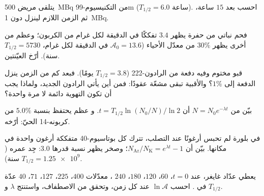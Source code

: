 \begin{exercise}[$\star\star$]\label{exo:g12:radioactive-decay:9}
يتلقى مريض \qty{500}{MBq} من التكنيسيوم-99m ($T_{1/2} = 6.0$
ساعة). احسب  بعد $15$ ساعة، ثم الزمن اللازم لينزل
دون \qty{1}{MBq}.
\end{exercise}

\begin{exercise}[$\star\star$]\label{exo:g12:radioactive-decay:10}
فحم نباتي من حفرة يظهر $3.4$ تفككًا في الدقيقة لكل غرام من الكربون؛
وعظم من أخرى يظهر $30\%$ من معدّل الأحياء ($\mathcal A_0 = 13.6$
في الدقيقة لكل غرام، $T_{1/2} = \num{5730}$ سنة). أرّخ العيّنتين.
\end{exercise}

\begin{exercise}[$\star\star$]\label{exo:g12:radioactive-decay:11}
قبو مختوم وفيه دفعة من الرادون-222 ($T_{1/2} = 3.8$
يومًا). فبعد كم من الزمن ينزل  الدفعة إلى $1\%$؟ والأقبية
 تبقى مشعّة عقودًا: فمن أين يأتي الرادون الجديد،
ولماذا يجب أن تكون التهوية دائمة لا مرة واحدة؟
\end{exercise}

\begin{exercise}[$\star\star\star$]\label{exo:g12:radioactive-decay:12}
بيّن من $N = N_0 e^{-\lambda t}$ أن $t = T_{1/2}\ln(N_0/N)/\ln 2$. و
عظم يحتفظ بنسبة $5.0\%$ من كربونه-14 الحيّ: أرّخه.
\end{exercise}

\begin{exercise}[$\star\star\star$]\label{exo:g12:radioactive-decay:13}
في بلورة لم تحبس أرغونًا عند التصلب، تترك كل  بوتاسيوم-40 متفككة
 أرغون واحدة في مكانها. بيّن أن
$N_{\mathrm{Ar}}/N_{\mathrm K} = e^{\lambda t} - 1$؛ وصخر يظهر نسبة
قدرها $3.0$: جِد عمره ($T_{1/2} = \num{1.25e9}$ سنة).
\end{exercise}

\begin{exercise}[$\star\star\star$]\label{exo:g12:radioactive-decay:14}
يعطي عدّاد غايغر، عند $t = 0$، $60$، $120$، $180$، $240$ ،
معدّلات $400$، $225$، $127$، $71$، $40$ عدّة في . احسب
$\ln \mathcal A$ عند كل زمن، وتحقق من الاصطفاف، واستنتج $\lambda$ و
$T_{1/2}$.
\end{exercise}

